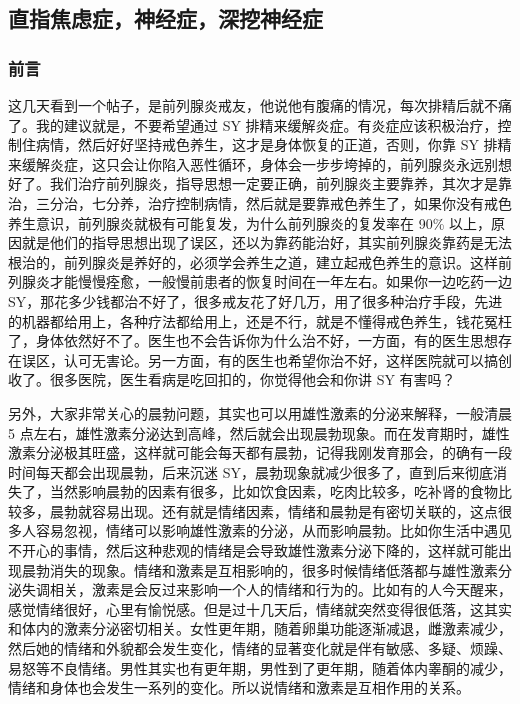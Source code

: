 \documentclass{ctexart}
\begin{document}
\subsection{直指焦虑症，神经症，深挖神经症}

\subsubsection{前言}

这几天看到一个帖子，是前列腺炎戒友，他说他有腹痛的情况，每次排精后就不痛了。我的建议就是，不要希望通过 SY 排精来缓解炎症。有炎症应该积极治疗，控制住病情，然后好好坚持戒色养生，这才是身体恢复的正道，否则，你靠 SY 排精来缓解炎症，这只会让你陷入恶性循环，身体会一步步垮掉的，前列腺炎永远别想好了。我们治疗前列腺炎，指导思想一定要正确，前列腺炎主要靠养，其次才是靠治，三分治，七分养，治疗控制病情，然后就是要靠戒色养生了，如果你没有戒色养生意识，前列腺炎就极有可能复发，为什么前列腺炎的复发率在 90\% 以上，原因就是他们的指导思想出现了误区，还以为靠药能治好，其实前列腺炎靠药是无法根治的，前列腺炎是养好的，必须学会养生之道，建立起戒色养生的意识。这样前列腺炎才能慢慢痊愈，一般慢前患者的恢复时间在一年左右。如果你一边吃药一边 SY，那花多少钱都治不好了，很多戒友花了好几万，用了很多种治疗手段，先进的机器都给用上，各种疗法都给用上，还是不行，就是不懂得戒色养生，钱花冤枉了，身体依然好不了。医生也不会告诉你为什么治不好，一方面，有的医生思想存在误区，认可无害论。另一方面，有的医生也希望你治不好，这样医院就可以搞创收了。很多医院，医生看病是吃回扣的，你觉得他会和你讲 SY 有害吗？

另外，大家非常关心的晨勃问题，其实也可以用雄性激素的分泌来解释，一般清晨 5 点左右，雄性激素分泌达到高峰，然后就会出现晨勃现象。而在发育期时，雄性激素分泌极其旺盛，这样就可能会每天都有晨勃，记得我刚发育那会，的确有一段时间每天都会出现晨勃，后来沉迷 SY，晨勃现象就减少很多了，直到后来彻底消失了，当然影响晨勃的因素有很多，比如饮食因素，吃肉比较多，吃补肾的食物比较多，晨勃就容易出现。还有就是情绪因素，情绪和晨勃是有密切关联的，这点很多人容易忽视，情绪可以影响雄性激素的分泌，从而影响晨勃。比如你生活中遇见不开心的事情，然后这种悲观的情绪是会导致雄性激素分泌下降的，这样就可能出现晨勃消失的现象。情绪和激素是互相影响的，很多时候情绪低落都与雄性激素分泌失调相关，激素是会反过来影响一个人的情绪和行为的。比如有的人今天醒来，感觉情绪很好，心里有愉悦感。但是过十几天后，情绪就突然变得很低落，这其实和体内的激素分泌密切相关。女性更年期，随着卵巢功能逐渐减退，雌激素减少，然后她的情绪和外貌都会发生变化，情绪的显著变化就是伴有敏感、多疑、烦躁、易怒等不良情绪。男性其实也有更年期，男性到了更年期，随着体内睾酮的减少，情绪和身体也会发生一系列的变化。所以说情绪和激素是互相作用的关系。
\end{document}
